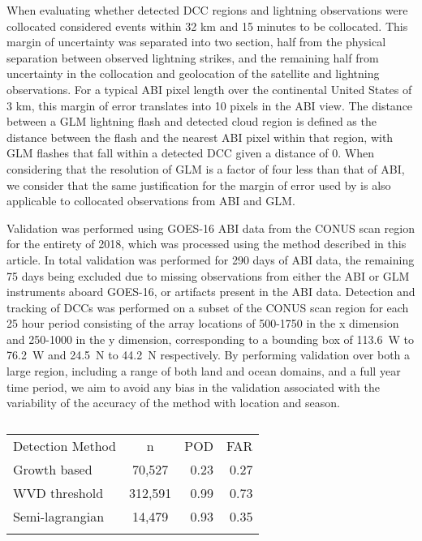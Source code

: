 When evaluating whether detected DCC regions and lightning observations were collocated \citet{muller_novel_2019} considered events within 32 \unit{km} and 15 minutes to be collocated.
This margin of uncertainty was separated into two section, half from the physical separation between observed lightning strikes, and the remaining half from uncertainty in the collocation and geolocation of the satellite and lightning observations.
For a typical ABI pixel length over the continental United States of 3 \unit{km}, this margin of error translates into 10 pixels in the ABI view.
The distance between a GLM lightning flash and detected cloud region is defined as the distance between the flash and the nearest ABI pixel within that region, with GLM flashes that fall within a detected DCC given a distance of 0.
When considering that the resolution of GLM is a factor of four less than that of ABI, we consider that the same justification for the margin of error used by \citet{muller_novel_2019} is also applicable to collocated observations from ABI and GLM.

Validation was performed using GOES-16 ABI data from the CONUS scan region for the entirety of 2018, which was processed using the method described in this article.
In total validation was performed for 290 days of ABI data, the remaining 75 days being excluded due to missing observations from either the ABI or GLM instruments aboard GOES-16, or artifacts present in the ABI data.
Detection and tracking of DCCs was performed on a subset of the CONUS scan region for each 25 hour period consisting of the array locations of 500-1750 in the x dimension and 250-1000 in the y dimension, corresponding to a bounding box of 113.6~\degree W to 76.2~\degree W and 24.5~\degree N to 44.2~\degree N respectively.
By performing validation over both a large region, including a range of both land and ocean domains, and a full year time period, we aim to avoid any bias in the validation associated with the variability of the accuracy of the method with location and season.

\begin{table}[t]
\caption{}
\label{table:validation}
\begin{tabular}{lcrr}
\tophline
Detection Method    & n         & POD       & FAR       \\ 
\middlehline
Growth based        & 70,527    & 0.23      & 0.27      \\
WVD threshold       & 312,591   & 0.99      & 0.73      \\
Semi-lagrangian     & 14,479    & 0.93      & 0.35      \\
\bottomhline
\end{tabular}
\end{table}


